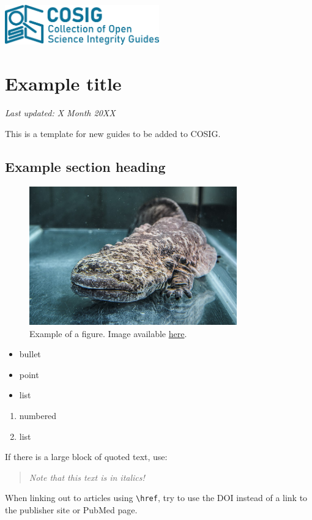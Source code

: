 \documentclass[letterpaper, 12pt]{article}
\begin{document}
\flushleft
\includegraphics[width=0.5\textwidth]{img/home/241017_final_logo_mockup.png}

\section*{Example title}
\textit{Last updated: X Month 20XX}

This is a template for new guides to be added to COSIG.

\subsection*{Example section heading}

\begin{figure}[h!tbp]
    \centering
    \includegraphics[width=0.8\textwidth]{img/home/chinese_giant_salamander.jpg}
    \caption*{Example of a figure. Image available \href{https://commons.wikimedia.org/wiki/File:Velemlok_\%C4\%8D\%C3\%ADnsk\%C3\%BD_zoo_praha_1.jpg}{here}.}
\end{figure}

\begin{itemize}
    \setlength\itemsep{-0.5em}
    \item bullet
    \item point
    \item list
\end{itemize}

\begin{enumerate}
    \setlength\itemsep{-0.5em}
    \item numbered
    \item list
\end{enumerate}

\pagebreak

If there is a large block of quoted text, use:

\begin{quote}
    \textit{Note that this text is in italics!}
\end{quote}

When linking out to articles using \verb|\href|, try to use the DOI instead of a link to the publisher site or PubMed page.
\end{document}
